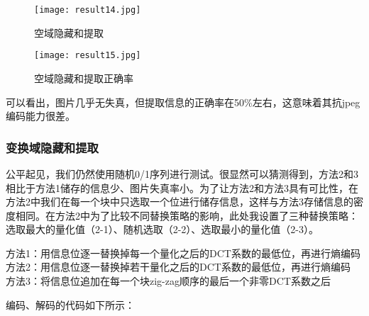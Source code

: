 \documentclass[a4paper]{article}
\begin{document}
\begin{figure}[ht]
    \centering
    \texttt{[image: result14.jpg]}
    \caption{空域隐藏和提取}
    \label{fig:result 14}
\end{figure}

\begin{figure}[ht]
    \centering
    \texttt{[image: result15.jpg]}
    \caption{空域隐藏和提取正确率}
    \label{fig:result 15}
\end{figure}

\par 可以看出，图片几乎无失真，但提取信息的正确率在50\%左右，这意味着其抗jpeg编码能力很差。

\subsubsection{变换域隐藏和提取}

\par 公平起见，我们仍然使用随机0/1序列进行测试。很显然可以猜测得到，方法2和3相比于方法1储存的信息少、图片失真率小。为了让方法2和方法3具有可比性，在方法2中我们在每一个块中只选取一个位进行储存信息，这样与方法3存储信息的密度相同。在方法2中为了比较不同替换策略的影响，此处我设置了三种替换策略：选取最大的量化值（2-1）、随机选取（2-2）、选取最小的量化值（2-3）。

\begin{description}
    \item[方法1：用信息位逐一替换掉每一个量化之后的DCT系数的最低位，再进行熵编码]
    
    \item[方法2：用信息位逐一替换掉若干量化之后的DCT系数的最低位，再进行熵编码]

    \item[方法3：将信息位追加在每一个块zig-zag顺序的最后一个非零DCT系数之后] 
    
\end{description}

\par 编码、解码的代码如下所示：
\end{document}
